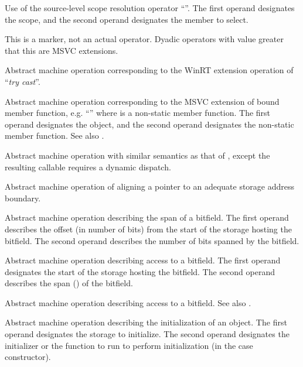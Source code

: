 Use of the source-level scope resolution operator ``\code{::}''.
The first operand designates the scope, and the second operand designates the member to select.

This is a marker, not an actual operator. Dyadic operators with 
value greater that this are MSVC extensions.

Abstract machine operation corresponding to the WinRT extension operation of ``\emph{try cast}''.

Abstract machine operation corresponding to the MSVC extension of bound member function, 
e.g. ``'' where  is a non-static member function.  
The first operand designates the object,
and the second operand designates the non-static member function.
See also .

Abstract machine operation with similar semantics as that of , except
the resulting callable requires a dynamic dispatch.

Abstract machine operation of aligning a pointer to an adequate storage address boundary.

Abstract machine operation describing the span of a bitfield.
The first operand describes the offset (in number of bits) from the start of the storage hosting the bitfield.
The second operand describes the number of bits spanned by the bitfield.

Abstract machine operation describing access to a bitfield.
The first operand designates the start of the storage hosting the bitfield.
The second operand describes the span () of the bitfield.

Abstract machine operation describing access to a bitfield.  
See also .

Abstract machine operation describing the initialization of an object.
The first operand designates the storage to initialize.
The second operand designates the initializer or the function to run to perform initialization (in the case constructor).

